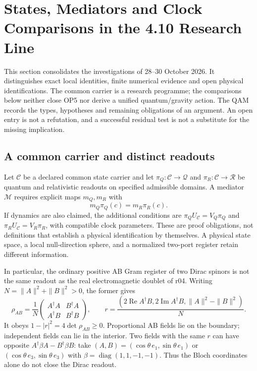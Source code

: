 \section{States, Mediators and Clock Comparisons in the 4.10 Research Line}
\label{sec:v410-state-mediator}

This section consolidates the investigations of 28--30 October 2026.
It distinguishes exact local identities, finite numerical evidence and
open physical identifications. The common carrier is a research programme;
the comparisons below neither close OP5 nor derive a unified quantum/gravity
action. The QAM records the types, hypotheses and remaining obligations of
an argument. An open entry is not a refutation, and a successful residual
test is not a substitute for the missing implication.

\subsection{A common carrier and distinct readouts}
\label{subsec:v410-readout-types}

Let \(\mathcal C\) be a declared common state carrier and let
\(\pi_Q:\mathcal C\to\mathcal Q\) and
\(\pi_R:\mathcal C\to\mathcal R\) be quantum and relativistic readouts
on specified admissible domains. A mediator \(\mathcal M\) requires
explicit maps \(m_Q,m_R\) with
\[
 m_Q\pi_Q(c)=m_R\pi_R(c).
\]
If dynamics are also claimed, the additional conditions are
\(\pi_Q U_{\mathcal C}=V_Q\pi_Q\) and
\(\pi_R U_{\mathcal C}=V_R\pi_R\), with compatible clock parameters.
These are proof obligations, not definitions that establish a physical
identification by themselves. A physical state space, a local null-direction
sphere, and a normalized two-port register retain different information.

In particular, the ordinary positive AB Gram register of two Dirac spinors
is not the same readout as the real electromagnetic doublet of r04.
Writing \(N=\|A\|^2+\|B\|^2>0\), the former gives
\[
 \rho_{AB}=\frac1N
 \begin{pmatrix}A^\dagger A&B^\dagger A\\A^\dagger B&B^\dagger B\end{pmatrix},
 \qquad
 r=\frac{(2\operatorname{Re}A^\dagger B,
                  2\operatorname{Im}A^\dagger B,
                  \|A\|^2-\|B\|^2)}N.
\]
It obeys \(1-|r|^2=4\det\rho_{AB}\ge0\). Proportional AB fields lie
on the boundary; independent fields can lie in the interior. Two fields
with the same \(r\) can have opposite
\(A^\dagger\beta A-B^\dagger\beta B\): take
\((A,B)=(\cos\theta\,e_1,\sin\theta\,e_1)\) or
\((\cos\theta\,e_3,\sin\theta\,e_3)\) with
\(\beta=\operatorname{diag}(1,1,-1,-1)\).
Thus the Bloch coordinates alone do not close the Dirac readout.

